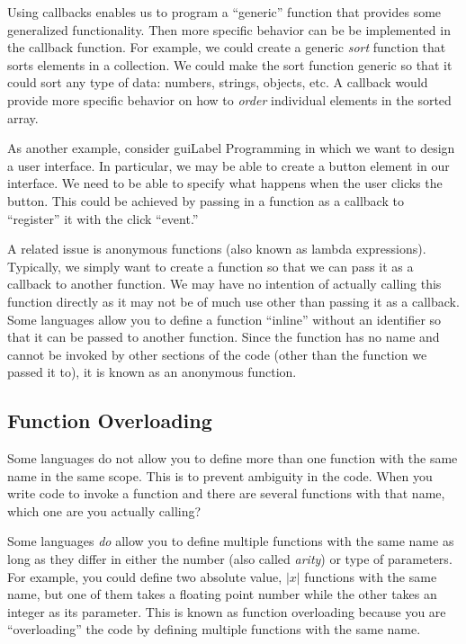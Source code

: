 Using callbacks enables us to program a ``generic'' function that 
provides some generalized functionality.  Then more specific behavior
can be be implemented in the callback function.  For example, we 
could create a generic \emph{sort} function that sorts elements in a
collection.  We could make the sort function generic so that it could
sort any type of data: numbers, strings, objects, etc.  A callback would
provide more specific behavior on how to \emph{order} individual
elements in the sorted array.  

As another example, consider \gls{guiLabel} Programming in which we
want to design a user interface.  In particular, we may be able to create
a button element in our interface.  We need to be able to specify what 
happens when the user clicks the button.  This could be achieved by
passing in a function as a callback to ``register'' it with the click ``event.''


A related issue is \glspl{anonymous function} (also known as 
\glspl{lambda expression}).  Typically, we simply 
want to create a function so that we can pass it as a callback to another 
function.  We may have no intention of actually calling this function directly
as it may not be of much use other than passing it as a callback.  Some 
languages allow you to define a function ``inline'' without an identifier 
so that it can be passed to another function.  Since the function has no
name and cannot be invoked by other sections of the code (other than
the function we passed it to), it is known as an anonymous function.

\subsection{Function Overloading}
\label{subsection:functionOverloading}
\label{function overloading}

Some languages do not allow you to define more than one function with
the same name in the same scope.  This is to prevent ambiguity in the
code.  When you write code to invoke a function and there are several
functions with that name, which one are you actually calling?  

Some languages \emph{do} allow you to define multiple functions
with the same name as long as they differ in either the number (also
called \emph{arity}) or 
type of parameters.  For example, you could define two absolute
value, $|x|$ functions with the same name, but one of them takes a floating
point number while the other takes an integer as its parameter.  This
is known as \gls{function overloading} because you are ``overloading''
the code by defining multiple functions with the same name.

